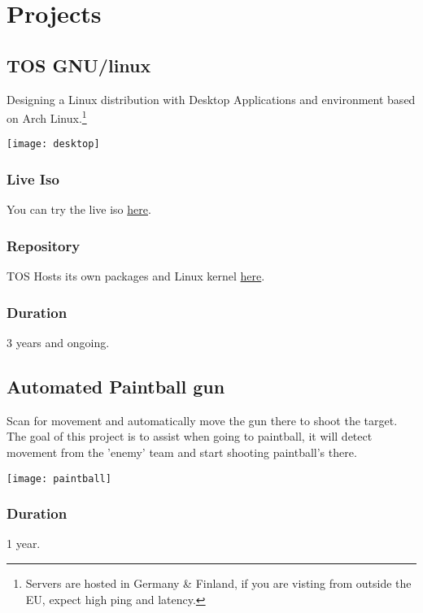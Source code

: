 \pagebreak
\section{Proje\textcolor{mycolor}{cts}}
  \subsection{TOS GNU/linux}
    Designing a Linux distribution with Desktop Applications and environment based on Arch Linux.\footnote{Servers are hosted in Germany \& Finland, if you are visting from outside the EU, expect high ping and latency.}

    \begin{center}
      \texttt{[image: desktop]}
    \end{center}

    \subsubsection{Live Iso}
      You can try the live iso \href{https://tos.odex.be}{here}.\footnotemark[\value{footnote}]
    \subsubsection{Repository}
      TOS Hosts its own packages and Linux kernel \href{https://repo.odex.be/list.html}{here}.\footnotemark[\value{footnote}]
    \subsubsection{Duration}
      3 years and ongoing.

  \subsection{Automated Paintball gun}
    Scan for movement and automatically move the gun there to shoot the target.
    The goal of this project is to assist when going to paintball,
    it will detect movement from the 'enemy' team and start shooting paintball's there.
    \begin{center}
      \texttt{[image: paintball]}
    \end{center}
    \subsubsection{Duration}
      1 year.

